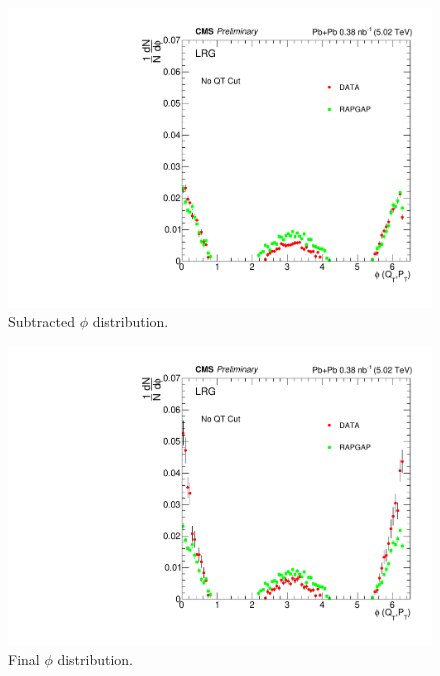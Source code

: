 \begin{figure}[h!]
\begin{centering}
\includegraphics[width=6in]{Chapter6/importfigs/phi_allQt_subbed.pdf}
\par\end{centering}
\caption{Subtracted $\phi$ distribution. \label{fig:subPhi}}
\end{figure}

\begin{figure}[h!]
\begin{centering}
\includegraphics[width=6in]{Chapter6/importfigs/phi_allQt_final.pdf}
\par\end{centering}
\caption{Final $\phi$ distribution. \label{fig:finPhi}}
\end{figure}